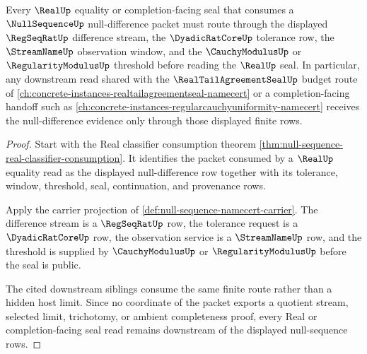 \begin{theorem}
\label{thm:null-sequence-downstream-real-consumer-route}
Every $\RealUp$ equality or completion-facing seal that consumes a $\NullSequenceUp$ null-difference packet must route through the displayed $\RegSeqRatUp$ difference stream, the $\DyadicRatCoreUp$ tolerance row, the $\StreamNameUp$ observation window, and the $\CauchyModulusUp$ or $\RegularityModulusUp$ threshold before reading the $\RealUp$ seal. In particular, any downstream read shared with the $\RealTailAgreementSealUp$ budget route of \autoref{ch:concrete-instances-realtailagreementseal-namecert} or a completion-facing handoff such as \autoref{ch:concrete-instances-regularcauchyuniformity-namecert} receives the null-difference evidence only through those displayed finite rows.
\end{theorem}
\begin{proof}
Start with the Real classifier consumption theorem \autoref{thm:null-sequence-real-classifier-consumption}. It identifies the packet consumed by a $\RealUp$ equality read as the displayed null-difference row together with its tolerance, window, threshold, seal, continuation, and provenance rows.

Apply the carrier projection of \autoref{def:null-sequence-namecert-carrier}. The difference stream is a $\RegSeqRatUp$ row, the tolerance request is a $\DyadicRatCoreUp$ row, the observation service is a $\StreamNameUp$ row, and the threshold is supplied by $\CauchyModulusUp$ or $\RegularityModulusUp$ before the seal is public.

The cited downstream siblings consume the same finite route rather than a hidden host limit. Since no coordinate of the packet exports a quotient stream, selected limit, trichotomy, or ambient completeness proof, every Real or completion-facing seal read remains downstream of the displayed null-sequence rows.
\end{proof}

